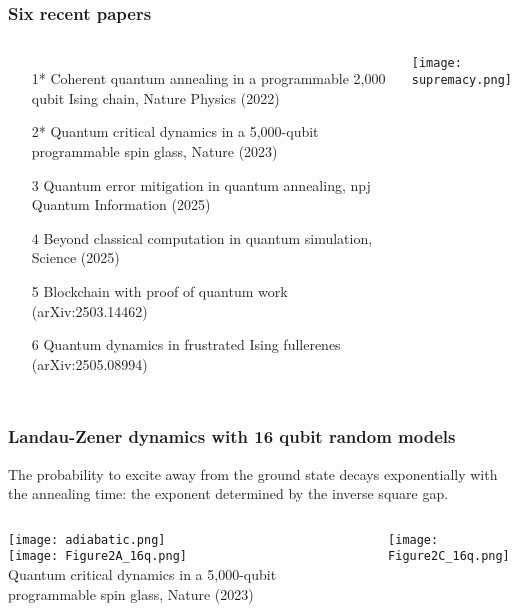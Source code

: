 \documentclass[aspectratio=169,final,11pt,forpublic]{beamer} %
\begin{document}
\begin{frame}\frametitle{\bf Six recent papers}
  \begin{columns}
    \vspace{-0.2cm}
  \begin{itemize}
    \item[1*] Coherent quantum annealing in
      a programmable 2,000 qubit Ising chain, Nature
      Physics (2022)
    \item[2*] Quantum critical dynamics in
      a 5,000-qubit programmable spin glass, Nature
      (2023)
    \item[3] Quantum error mitigation in quantum annealing, npj Quantum Information (2025)
    \item[4] Beyond classical computation in quantum simulation, Science (2025)
    \item[5] Blockchain with proof of quantum work (arXiv:2503.14462)
    \item[6] Quantum dynamics in frustrated Ising fullerenes (arXiv:2505.08994)
  \end{itemize}
  \texttt{[image: supremacy.png]}
\end{columns}
\end{frame}


\begin{frame}\frametitle{\bf Landau-Zener dynamics with 16 qubit random models}
  The probability to excite away from the ground state decays exponentially with the annealing time: the exponent determined by the inverse square gap. 
  \begin{columns}
    \begin{center}
    \texttt{[image: adiabatic.png]}\\
    \texttt{[image: Figure2A\_16q.png]}\\
    {\small Quantum critical dynamics in
      a 5,000-qubit programmable spin glass, Nature
      (2023)}
    \end{center}
    \texttt{[image: Figure2C\_16q.png]}
    \end{columns}
\end{frame}
\end{document}
